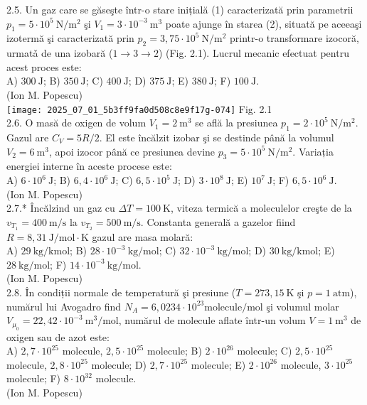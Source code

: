 2.5. Un gaz care se găseşte într-o stare inițială (1) caracterizată prin parametrii $p_{1}=5 \cdot 10^{5} \mathrm{~N} / \mathrm{m}^{2}$ şi $V_{1}=3 \cdot 10^{-3} \mathrm{~m}^{3}$ poate ajunge în starea (2), situată pe aceeaşi izotermă şi caracterizată prin $p_{2}=3,75 \cdot 10^{5} \mathrm{~N} / \mathrm{m}^{2}$ printr-o transformare izocoră, urmatǎ de una izobară ($1 \rightarrow 3 \rightarrow 2$) (Fig. 2.1). Lucrul mecanic efectuat pentru acest proces este:\\ A) $300 \mathrm{~J}$; B) $350 \mathrm{~J}$; C) $400 \mathrm{~J}$; D) $375 \mathrm{~J}$; E) $380 \mathrm{~J}$; F) $100 \mathrm{~J}$.\\ (Ion M. Popescu)\\ \texttt{[image: 2025\_07\_01\_5b3ff9fa0d508c8e9f17g-074]} Fig. 2.1\\

2.6. O masă de oxigen de volum $V_{1}=2 \mathrm{~m}^{3}$ se află la presiunea $p_{1}=2 \cdot 10^{5} \mathrm{~N} / \mathrm{m}^{2}$. Gazul are $C_{V}=5 R / 2$. El este încălzit izobar şi se destinde până la volumul $V_{2}=6 \mathrm{~m}^{3}$, apoi izocor până ce presiunea devine $p_{3}=5 \cdot 10^{5} \mathrm{~N} / \mathrm{m}^{2}$. Variația energiei interne în aceste procese este:\\ A) $6 \cdot 10^{6} \mathrm{~J}$; B) $6,4 \cdot 10^{6} \mathrm{~J}$; C) $6,5 \cdot 10^{5} \mathrm{~J}$; D) $3 \cdot 10^{8} \mathrm{~J}$; E) $10^{7} \mathrm{~J}$; F) $6,5 \cdot 10^{6} \mathrm{~J}$.\\ (Ion M. Popescu)\\

2.7.* Încălzind un gaz cu $\Delta T=100 \mathrm{~K}$, viteza termică a moleculelor creşte de la $v_{T_{1}}=400 \mathrm{~m} / \mathrm{s}$ la $v_{T_{2}}=500 \mathrm{~m} / \mathrm{s}$. Constanta generală a gazelor fiind $R=8,31 \mathrm{~J} / \mathrm{mol} \cdot \mathrm{K}$ gazul are masa molară:\\ A) $29 \mathrm{~kg} / \mathrm{kmol}$; B) $28 \cdot 10^{-3} \mathrm{~kg} / \mathrm{mol}$; C) $32 \cdot 10^{-3} \mathrm{~kg} / \mathrm{mol}$; D) $30 \mathrm{~kg} / \mathrm{kmol}$; E) $28 \mathrm{~kg} / \mathrm{mol}$; F) $14 \cdot 10^{-3} \mathrm{~kg} / \mathrm{mol}$.\\ (Ion M. Popescu)\\

2.8. În condiții normale de temperatură şi presiune ($T=273,15 \mathrm{~K}$ şi $p=1 \mathrm{~atm}$), numărul lui Avogadro find $N_{A}=6,0234 \cdot 10^{23} \mathrm{molecule} / \mathrm{mol}$ şi volumul molar $V_{\mu_{0}}=22,42 \cdot 10^{-3} \mathrm{~m}^{3} / \mathrm{mol}$, numărul de molecule aflate într-un volum $V=1 \mathrm{~m}^{3}$ de oxigen sau de azot este:\\ A) $2,7 \cdot 10^{25}$ molecule, $2,5 \cdot 10^{25}$ molecule; B) $2 \cdot 10^{26}$ molecule; C) $2,5 \cdot 10^{25}$ molecule, $2,8 \cdot 10^{25}$ molecule; D) $2,7 \cdot 10^{25}$ molecule; E) $2 \cdot 10^{26}$ molecule, $3 \cdot 10^{25}$ molecule; F) $8 \cdot 10^{32}$ molecule.\\ (Ion M. Popescu)\\

